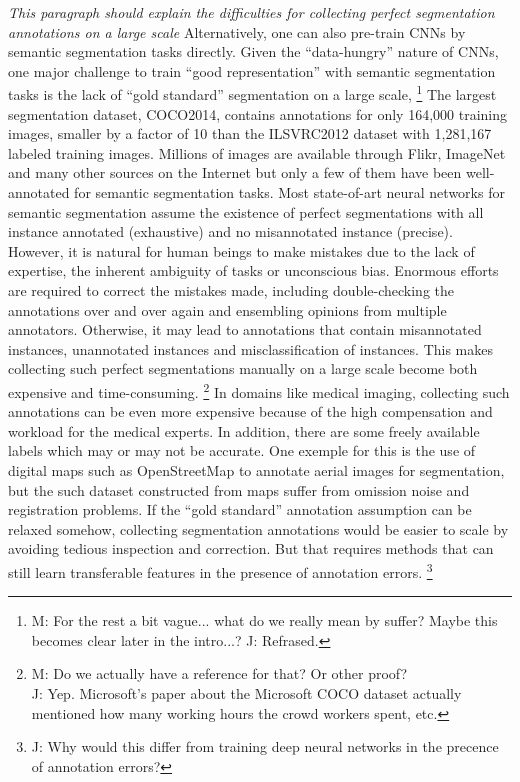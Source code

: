 \noindent
\textit{This paragraph should explain the difficulties for collecting perfect segmentation annotations on a large scale}
Alternatively, one can also pre-train CNNs by semantic segmentation tasks directly.
Given the ``data-hungry'' nature of CNNs, one major challenge to train ``good representation'' with semantic segmentation tasks is the lack of ``gold standard'' segmentation on a large scale,
\footnote{M: For the rest a bit vague... what do we really mean by suffer? Maybe this becomes clear later in the intro...? J: Refrased.}
The largest segmentation dataset, COCO2014\cite{lin2014microsoft}, contains annotations for only 164,000 training images, smaller by a factor of 10 than the ILSVRC2012 dataset with 1,281,167 labeled training images.
Millions of images are available through Flikr, ImageNet and many other sources on the Internet but only a few of them \cite{everingham2015pascal,mottaghi2014role,lin2014microsoft} have been well-annotated for semantic segmentation tasks.
Most state-of-art neural networks for semantic segmentation \cite{long2015fully,zheng2015conditional} assume the existence of perfect segmentations with all instance annotated (exhaustive) and no misannotated instance (precise).
However, it is natural for human beings to make mistakes due to the lack of expertise, the inherent ambiguity of tasks or unconscious bias.
Enormous efforts are required to correct the mistakes made, including double-checking the annotations over and over again and ensembling opinions from multiple annotators.
Otherwise, it may lead to annotations that contain misannotated instances, unannotated instances and misclassification of instances.
This makes collecting such perfect segmentations manually on a large scale become both expensive and time-consuming. \cite{lin2014microsoft}
\footnote{M: Do we actually have a reference for that?  Or other proof?\\J: Yep. Microsoft's paper about the Microsoft COCO dataset actually mentioned how many working hours the crowd workers spent, etc.}
In domains like medical imaging, collecting such annotations can be even more expensive because of the high compensation and workload for the medical experts.
In addition, there are some freely available labels which may or may not be accurate.
One exemple for this is the use of digital maps such as OpenStreetMap to annotate aerial images for segmentation, but the such dataset constructed from maps suffer from omission noise and registration problems.\cite{mnih2012learning}
If the ``gold standard'' annotation assumption can be relaxed somehow, collecting segmentation annotations would be easier to scale by avoiding tedious inspection and correction.
But that requires methods that can still learn transferable features in the presence of annotation errors.
\footnote{J: Why would this differ from training deep neural networks in the precence of annotation errors?}


